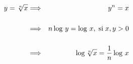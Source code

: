 \documentclass{article} %
\begin{document}
\begin{eqnarray}
y=\sqrt[n]{x} &\Longrightarrow &y^n = x \nonumber\\[0.5cm]
&\Longrightarrow &n\log \,y=\log\,x,
\;\mbox{si}\; x,y>0 \\[0.5cm]
&\Longrightarrow &\log \sqrt[n]{x}={1 \over n}\log \,x
\end{eqnarray}
\end{document}

